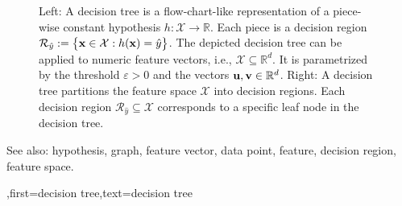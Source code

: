 {{\begin{figure}[H]
\begin{minipage}{.45\textwidth}
\end{minipage}
	\caption{Left: A decision tree is a flow-chart-like representation of a piece-wise constant hypothesis $h: \mathcal{X} \rightarrow \mathbb{R}$.  Each piece is a decision region $\mathcal{R}_{\hat{y}} := \big\{ {\bf x} \in  \mathcal{X}: h({\bf x}) = \hat{y} \big\}$. 
		The depicted decision tree can be applied to numeric feature vectors, i.e., $\mathcal{X} \subseteq \mathbb{R}^{d}$. It is  parametrized by the threshold $\varepsilon>0$ and the vectors ${\bf u}, {\bf v} \in \mathbb{R}^{d}$. 
		Right: A decision tree partitions  
		the feature space $\mathcal{X}$ into decision regions. Each decision region  
		$\mathcal{R}_{\hat{y}} \!\subseteq\!\mathcal{X}$ corresponds to a specific leaf node in the decision tree.}
	\label{fig_decision_tree}
\end{figure} 
		See also: hypothesis, graph, feature vector, data point, feature, decision region, feature space.
	  }
	  ,first={decision tree},text={decision tree} }

